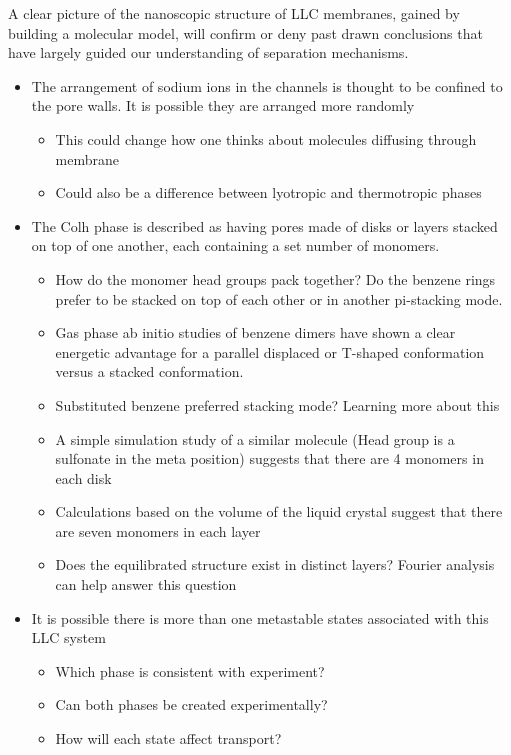 \documentclass{article}
\begin{document}
	A clear picture of the nanoscopic structure of LLC membranes, gained by building a molecular model, will confirm or deny past drawn conclusions that have largely guided our understanding of separation mechanisms. 
	\begin{itemize}
		\item The arrangement of sodium ions in the channels is thought to be confined to the pore walls. It is possible they are arranged more randomly
		\begin{itemize}
			\item This could change how one thinks about molecules diffusing through membrane
			\item Could also be a difference between lyotropic and thermotropic phases
		\end{itemize}
		\item The Colh phase is described as having pores made of disks or layers stacked on top of one another, each containing a set number of monomers. 
		\begin{itemize}
			\item How do the monomer head groups pack together? Do the benzene rings prefer to be stacked on top of each other or in another pi-stacking mode.
			\item Gas phase ab initio studies of benzene dimers have shown a clear energetic advantage for a parallel displaced or T-shaped conformation versus a stacked conformation. 
			\item Substituted benzene preferred stacking mode? Learning more about this   	
			\item A simple simulation study of a similar molecule (Head group is a sulfonate in the meta position) suggests that there are 4 monomers in each disk
			\item Calculations based on the volume of the liquid crystal suggest that there are seven monomers in each layer 
			\item Does the equilibrated structure exist in distinct layers? Fourier analysis can help answer this question
		\end{itemize}
		\item It is possible there is more than one metastable states associated with this LLC system
		\begin{itemize}
			\item Which phase is consistent with experiment?
			\item Can both phases be created experimentally?
			\item How will each state affect transport?
		\end{itemize}
	\end{itemize}
	
\end{document}
